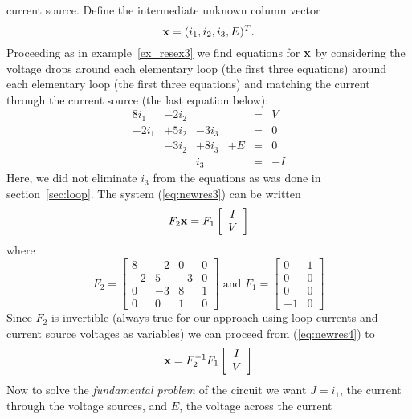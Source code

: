 current source. Define the intermediate unknown column vector 
\[
{\bf x} = (i_1, i_2, i_3, E)^T.
\] 
Proceeding as in example~\ref{ex_resex3} we find equations for $\bf x$ by considering the 
voltage drops around each elementary loop (the first three equations) around each 
elementary loop (the first three equations) and matching the current through the 
current source (the last equation below):
\begin{equation}
\label{eq:newres3}
\begin{array}{cccccc}
8i_1 & -2i_2 & & & = & V \\
-2i_1 & +5i_2 & -3i_3 & & = & 0 \\
 & -3i_2 & +8i_3 & + E & = & 0 \\
  & & i_3 & & = & -I 
\end{array}
\end{equation}
Here, we did not eliminate $i_3$ from the equations as was done in section~\ref{sec:loop}. 
The system (\ref{eq:newres3}) can be written 
\begin{equation}
\label{eq:newres4}
F_2 {\bf x} = F_1 \left[ \begin{array}{c} I \\ V \end{array} \right]
\end{equation}
where
\[
F_2 = \left[ \begin{array}{cccc} 
8 & -2 & 0 & 0 \\
-2 & 5 & -3 & 0 \\
0 & -3 & 8 & 1 \\
0 & 0 & 1 & 0 
\end{array} \right]
\mbox{\ \ \ and \ \ \ }
F_1 = \left[ \begin{array}{cc}
0 & 1 \\
0 & 0 \\
0 & 0 \\
-1 & 0 
\end{array} \right]
\]
Since $F_2$ is invertible (always true for our approach using loop currents and 
current source voltages as variables) we can proceed from (\ref{eq:newres4}) to 
\begin{equation}
\label{eq:newres5}
{\bf x} = F_2^{-1} F_1 \left[ \begin{array}{c} I \\ V \end{array} \right]
\end{equation}
Now to solve the {\em fundamental problem} of the circuit we want $J=i_1$, the 
current through the voltage sources, and $E$, the voltage across the current 
